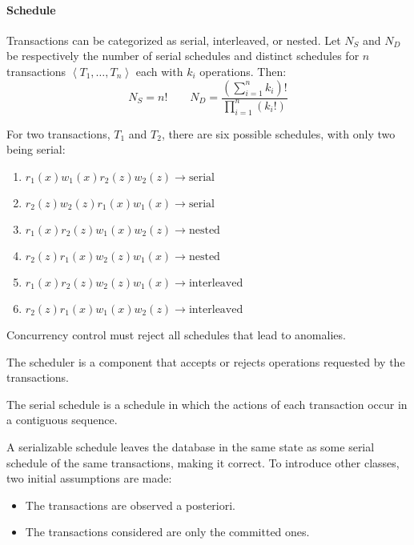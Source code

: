 \paragraph*{Schedule}
Transactions can be categorized as serial, interleaved, or nested. 
Let $N_S$ and $N_D$ be respectively the number of serial schedules and distinct schedules for $n$ transactions $\left\langle T_1,\dots,T_n\right\rangle $ each with $k_i$ operations. 
Then:
\[N_S=n! \qquad N_D=\dfrac{\left( \sum_{i=1}^nk_i \right)!}{\prod_{i=1}^n \left( k_i! \right)}\]
\begin{example}
    For two transactions, $T_1$ and $T_2$, there are six possible schedules, with only two being serial:
    \begin{enumerate}
        \item $r_1(x) w_1(x) r_2(z) w_2(z) \rightarrow \text{serial}$
        \item $r_2(z) w_2(z) r_1(x) w_1(x) \rightarrow \text{serial}$
        \item $r_1(x) r_2(z) w_1(x) w_2(z) \rightarrow \text{nested}$
        \item $r_2(z) r_1(x) w_2(z) w_1(x) \rightarrow \text{nested}$
        \item $r_1(x) r_2(z) w_2(z) w_1(x) \rightarrow \text{interleaved}$
        \item $r_2(z) r_1(x) w_1(x) w_2(z) \rightarrow \text{interleaved}$
    \end{enumerate}
\end{example}
Concurrency control must reject all schedules that lead to anomalies.
\begin{definition}
    The scheduler is a component that accepts or rejects operations requested by the transactions. 
\end{definition}
\begin{definition}
    The serial schedule is a schedule in which the actions of each transaction occur in a contiguous sequence.
\end{definition}
A serializable schedule leaves the database in the same state as some serial schedule of the same transactions, making it correct. 
To introduce other classes, two initial assumptions are made:
\begin{itemize}
    \item The transactions are observed a posteriori. 
    \item The transactions considered are only the committed ones. 
\end{itemize}